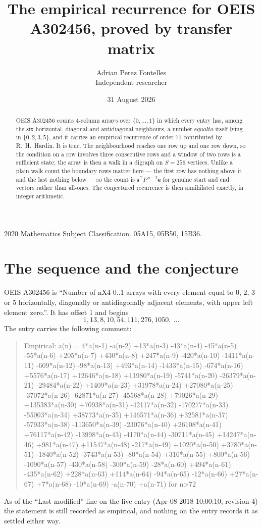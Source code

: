 \documentclass[11pt,a4paper]{article}
\title{The empirical recurrence for OEIS A302456, proved by transfer matrix}
\author{Adrian Perez Fontelles\\ \small Independent researcher}
\date{31 August 2026}
\theoremstyle{plain}
\theoremstyle{definition}
\begin{document}
\maketitle

\begin{abstract}
OEIS A302456 counts $4$-column arrays over $\{0,\dots,1\}$ in which every entry has,
among the six horizontal, diagonal and antidiagonal neighbours, a number $equal to$ itself lying in $\{0,2,3,5\}$, and it carries an empirical
recurrence of order $71$ contributed by R.~H.~Hardin. It is true. The neighbourhood
reaches one row up and one row down, so the condition on a row involves three consecutive
rows and a window of two rows is a sufficient state; the array is then a walk in a digraph
on $S=256$ vertices. Unlike a plain walk count the boundary rows matter here --- the first
row has nothing above it and the last nothing below --- so the count is
$\mathbf{s}^{\!\top}P^{\,n-2}\mathbf{e}$ for genuine start and end vectors rather than
all-ones. The conjectured recurrence is then annihilated exactly, in integer arithmetic.
\end{abstract}

\noindent\small 2020 Mathematics Subject Classification. 05A15, 05B50, 15B36.\normalsize

\section{The sequence and the conjecture}

OEIS A302456 is ``Number of nX4 0..1 arrays with every element equal to 0, 2, 3 or 5 horizontally, diagonally or antidiagonally adjacent elements, with upper left element zero.''. It has offset
$1$ and begins
\[
1, 13, 8, 10, 54, 111, 276, 1050,\ \dots
\]
The entry carries the following comment:
\begin{quote}\small
Empirical: a(n) = 4*a(n-1) -a(n-2) +13*a(n-3) -43*a(n-4) -45*a(n-5) -55*a(n-6) +205*a(n-7) +430*a(n-8) +247*a(n-9) -420*a(n-10) -1411*a(n-11) -609*a(n-12) -98*a(n-13) +493*a(n-14) -1433*a(n-15) -674*a(n-16) +5576*a(n-17) +12646*a(n-18) +11980*a(n-19) -5741*a(n-20) -26379*a(n-21) -29484*a(n-22) +1409*a(n-23) +31978*a(n-24) +27080*a(n-25) -37072*a(n-26) -62871*a(n-27) -45568*a(n-28) +79026*a(n-29) +135383*a(n-30) +70938*a(n-31) -42117*a(n-32) -170277*a(n-33) -55003*a(n-34) +38773*a(n-35) +146571*a(n-36) +32581*a(n-37) -57933*a(n-38) -113650*a(n-39) -23076*a(n-40) +26108*a(n-41) +76117*a(n-42) -13998*a(n-43) -4170*a(n-44) -30711*a(n-45) +14247*a(n-46) +981*a(n-47) +11547*a(n-48) -217*a(n-49) +1020*a(n-50) +3780*a(n-51) -1840*a(n-52) -3743*a(n-53) -80*a(n-54) +316*a(n-55) +800*a(n-56) -1090*a(n-57) -430*a(n-58) -300*a(n-59) -28*a(n-60) +494*a(n-61) -435*a(n-62) +228*a(n-63) +114*a(n-64) -94*a(n-65) -12*a(n-66) +27*a(n-67) +7*a(n-68) -10*a(n-69) -a(n-70) +a(n-71) for n>72
\end{quote}
As of the ``Last modified'' line on the live entry (Apr 08 2018 10:00:10, revision
4) the statement is still recorded as empirical, and nothing on the entry
records it as settled either way.
\end{document}
